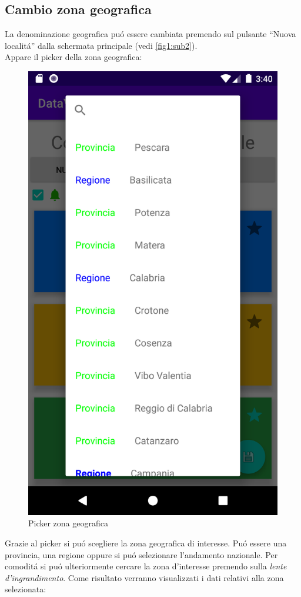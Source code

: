 \documentclass{article}
\newcommand{\quotes}[1]{``#1''}
\begin{document}
    \subsection{Cambio zona geografica}
    La denominazione geografica puó essere cambiata premendo sul pulsante \quotes{Nuova localitá} dalla schermata principale (vedi \ref{fig1:sub2}).
    \\
    Appare il picker della zona geografica:

    \begin{figure}[h]
        \centering
        \includegraphics[width=.5\linewidth]{DPC_geo_picker.png}
        \caption{Picker zona geografica}
        \label{fig2}
    \end{figure}

    Grazie al picker si puó scegliere la zona geografica di interesse. Puó essere una provincia, una regione oppure si puó selezionare l'andamento nazionale.
    Per comoditá si puó ulteriormente cercare la zona d'interesse premendo sulla \emph{lente d'ingrandimento}.
    Come risultato verranno visualizzati i dati relativi alla zona selezionata:
\end{document}
